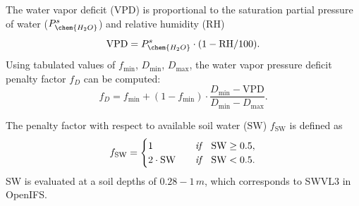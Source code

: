 \documentclass[gmd, manuscript]{copernicus}
\begin{document}
The water vapor deficit (VPD) is proportional to the saturation partial pressure of water ($P_\chem{H_2O}^s$) and relative humidity ($\text{RH}$)
%
\begin{equation}
  \text{VPD} = P_\chem{H_2O}^s \cdot (1 - \text{RH}/100).
\end{equation}
%
Using tabulated values of $f_\text{min}$, $D_\text{min}$, $D_\text{max}$, the water vapor pressure deficit penalty factor $f_D$ can be computed:
%
\begin{equation}
  f_D = f_\text{min}+(1-f_\text{min}) \cdot \frac{D_\text{min} - \text{VPD}}{D_\text{min}-D_\text{max}}.
\end{equation}

The penalty factor with respect to available soil water ($\text{SW}$) $f_\text{SW}$ is defined as 
%
\begin{equation}
  f_\text{SW} =
  \begin{cases}
    1 & \quad \emph{if} \quad \text{SW} \geq 0.5,\\
    2 \cdot \text{SW}  & \quad \emph{if} \quad \text{SW} < 0.5.
  \end{cases}
\end{equation}
SW is evaluated at a soil depths of $0.28-1\,\unit{m}$, which corresponds to SWVL3 in OpenIFS.
\end{document}
